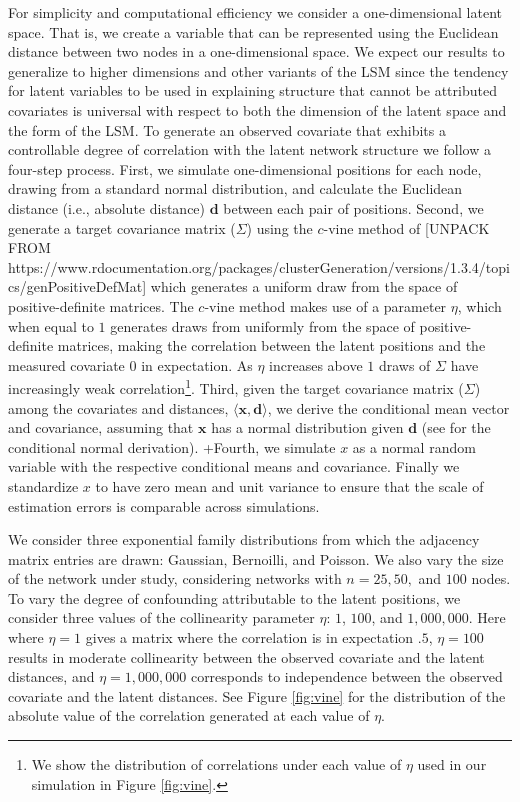 \documentclass[11pt]{article}
\begin{document}
For simplicity and computational efficiency we consider a one-dimensional latent space. That is, we create a variable that can be represented using the Euclidean distance between two nodes in a one-dimensional space. We expect our results to generalize to higher dimensions and other variants of the LSM since the tendency for latent variables to be used in explaining structure that cannot be attributed covariates is universal with respect to both the dimension of the latent space and the form of the LSM. To generate an observed covariate that exhibits a controllable degree of correlation with the latent network structure we follow a four-step process. First, we simulate one-dimensional positions for each node, drawing from a standard normal distribution, and calculate the Euclidean distance (i.e., absolute distance) $\mathbf{d}$ between each pair of positions. Second, we generate a target covariance matrix ($\Sigma$) using the $c$-vine method of \cite{lewandowski2009generating} [UNPACK FROM https://www.rdocumentation.org/packages/clusterGeneration/versions/1.3.4/topics/genPositiveDefMat] which generates a uniform draw from the space of positive-definite matrices. The $c$-vine method makes use of a parameter $\eta$, which when equal to $1$ generates draws from uniformly from the space of positive-definite matrices, making the correlation between the latent positions and the measured covariate 0 in expectation. As $\eta$ increases above $1$ draws of $\Sigma$ have increasingly weak correlation\footnote{We show the distribution of correlations under each value of $\eta$ used in our simulation in Figure \ref{fig:vine}.}. Third, given the target covariance matrix ($\Sigma$) among the covariates and distances, $\langle \mathbf{x}, \mathbf{d} \rangle$, we derive the conditional mean vector and covariance, assuming that $\mathbf{x}$ has a normal distribution given $\mathbf{d}$ (see \cite[pp. 116--117]{eaton1983} for the conditional normal derivation).
+Fourth, we simulate $x$ as a normal random variable with the respective conditional means and covariance. Finally we standardize $x$ to have zero mean and unit variance to ensure that the scale of estimation errors is comparable across simulations.

We consider three exponential family distributions from which the adjacency matrix entries are drawn: Gaussian, Bernoilli, and Poisson. We also vary the size of the network under study, considering networks with $n = 25, 50,$ and $100$ nodes. To vary the degree of confounding attributable to the latent positions, we consider three values of the collinearity parameter $\eta$: $1$, $100$, and $1,000,000$. Here  where $\eta = 1$ gives a matrix where the correlation is in expectation $.5$, $\eta = 100$ results in moderate collinearity between the observed covariate and the latent distances, and $\eta = 1,000,000$ corresponds to independence between the observed covariate and the latent distances. See Figure \ref{fig:vine} for the distribution of the absolute value of the correlation generated at each value of $\eta$.
\end{document}
